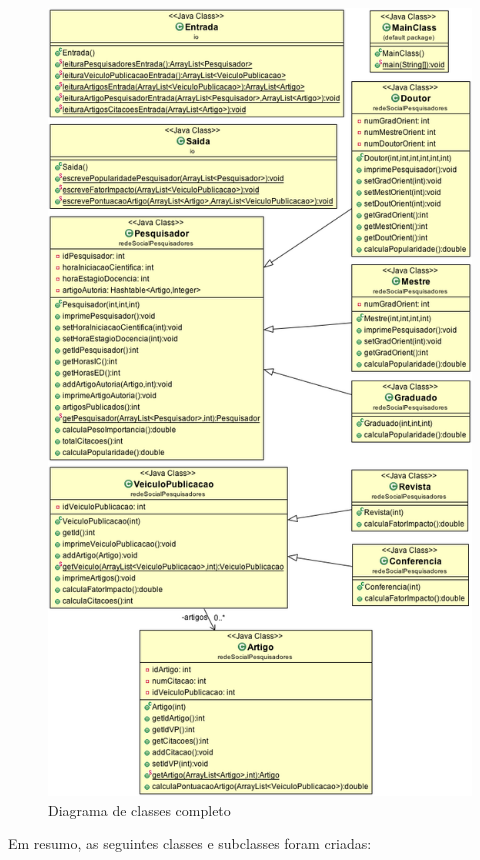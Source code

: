 \documentclass[12pt]{article}
\begin{document}
\begin{figure}[h!]
	\centering
	\includegraphics[width=.8\textwidth]{umlfull.png}
	\caption{Diagrama de classes completo}
	\label{umlfull}
\end{figure}


Em resumo, as seguintes classes e subclasses foram criadas:
\end{document}
